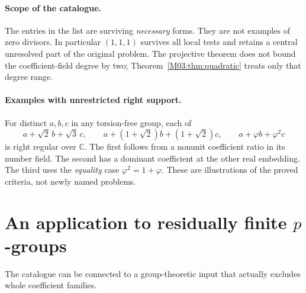 \documentclass[11pt,a4paper,oneside]{report}
\theoremstyle{definition}
\theoremstyle{remark}
\newcommand{\C}{\mathbb C}
\newcommand{\ph}{\varphi}
\begin{document}
\paragraph{Scope of the catalogue.}
The entries in the list are surviving \emph{necessary} forms. They are not examples of zero divisors. In particular \((1,1,1)\) survives all local tests and retains a central unresolved part of the original problem. The projective theorem does not bound the coefficient-field degree by two; Theorem~\ref{M03:thm:quadratic} treats only that degree range.

\paragraph{Examples with unrestricted right support.}
For distinct \(a,b,c\) in any torsion-free group, each of
\[
a+\sqrt2\,b+\sqrt3\,c,\qquad
a+(1+\sqrt2)b+(1+\sqrt2)c,\qquad
a+\ph b+\ph^2c
\]
is right regular over \(\C\). The first follows from a nonunit coefficient ratio in its number field. The second has a dominant coefficient at the other real embedding. The third uses the \emph{equality} case \(\ph^2=1+\ph\). These are illustrations of the proved criteria, not newly named problems.

\section{An application to residually finite \texorpdfstring{\(p\)}{p}-groups}\label{M03:sec:residualp}
The catalogue can be connected to a group-theoretic input that actually excludes whole coefficient families.
\end{document}
